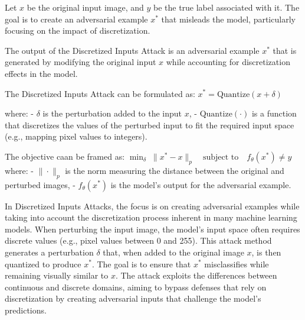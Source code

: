 Let $x$ be the original input image, and $y$ be the true label associated with it. The goal is to create an adversarial example $x^*$ that misleads the model, particularly focusing on the impact of discretization.

The output of the Discretized Inputs Attack is an adversarial example $x^*$ that is generated by modifying the original input $x$ while accounting for discretization effects in the model.

The Discretized Inputs Attack can be formulated as:
$x^* = \text{Quantize}(x + \delta)$

where:
- $\delta$ is the perturbation added to the input $x$,
- $\text{Quantize}(\cdot)$ is a function that discretizes the values of the perturbed input to fit the required input space (e.g., mapping pixel values to integers).

The objective caan be framed as:
$\min_{\delta} \; \|x^* - x\|_p \quad \text{subject to} \quad f_\theta(x^*) \neq y$
where:
- $\|\cdot\|_p$ is the norm measuring the distance between the original and perturbed images,
- $f_\theta(x^*)$ is the model's output for the adversarial example.

In Discretized Inputs Attacks, the focus is on creating adversarial examples while taking into account the discretization process inherent in many machine learning models. When perturbing the input image, the model's input space often requires discrete values (e.g., pixel values between 0 and 255). This attack method generates a perturbation $\delta$ that, when added to the original image $x$, is then quantized to produce $x^*$. The goal is to ensure that $x^*$ misclassifies while remaining visually similar to $x$. The attack exploits the differences between continuous and discrete domains, aiming to bypass defenses that rely on discretization by creating adversarial inputs that challenge the model's predictions.
